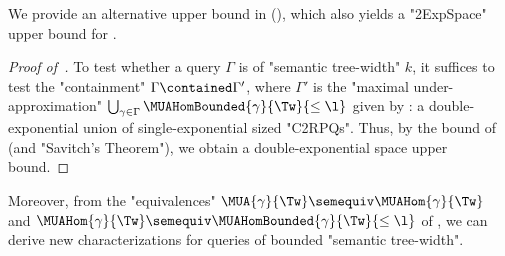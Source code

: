 We provide an alternative upper bound in
 (),
which also yields a "2ExpSpace" upper bound for .



\begin{proof}[Proof of~]
To test whether a query $\Gamma$ is of "semantic tree-width" $k$, it suffices to test the "containment" $\Gamma \contained \Gamma'$, where $\Gamma'$ is the "maximal under-approximation" $\bigcup_{\gamma \in \Gamma}\MUAHomBounded{\gamma}{\Tw}{\leq\l}$ given by : a double-exponential union of single-exponential sized "C2RPQs". Thus, by the bound of  (and "Savitch's Theorem"), we obtain a double-exponential space upper bound.
\end{proof}



Moreover, from the "equivalences"
$\MUA{\gamma}{\Tw} \semequiv \MUAHom{\gamma}{\Tw}$ and
$\MUAHom{\gamma}{\Tw} \semequiv \MUAHomBounded{\gamma}{\Tw}{\leq\l}$ of
, we can derive
new characterizations for queries of bounded "semantic tree-width".
\begin{mainstatement}
    \closureundersublanguages
\end{mainstatement}

